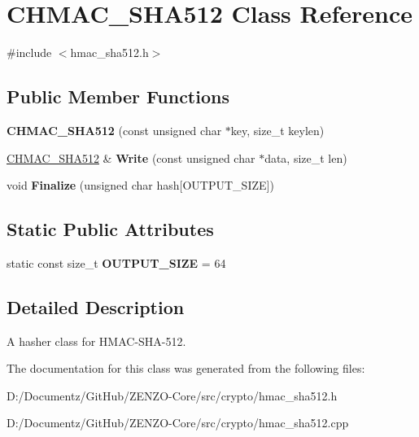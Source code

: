 \hypertarget{class_c_h_m_a_c___s_h_a512}{}\section{C\+H\+M\+A\+C\+\_\+\+S\+H\+A512 Class Reference}
\label{class_c_h_m_a_c___s_h_a512}


{\ttfamily \#include $<$hmac\+\_\+sha512.\+h$>$}

\subsection*{Public Member Functions}
\begin{DoxyCompactItemize}
\item 
\mbox{\label{class_c_h_m_a_c___s_h_a512_a03e1288c20422f66b7e732aafda804e5}} 
{\bfseries C\+H\+M\+A\+C\+\_\+\+S\+H\+A512} (const unsigned char $\ast$key, size\+\_\+t keylen)
\item 
\mbox{\label{class_c_h_m_a_c___s_h_a512_aefdf2b068b668027b67c8822227a5a18}} 
\mbox{\hyperlink{class_c_h_m_a_c___s_h_a512}{C\+H\+M\+A\+C\+\_\+\+S\+H\+A512}} \& {\bfseries Write} (const unsigned char $\ast$data, size\+\_\+t len)
\item 
\mbox{\label{class_c_h_m_a_c___s_h_a512_a3042ed5129bd381eb18ed2da201d6ed5}} 
void {\bfseries Finalize} (unsigned char hash\mbox{[}O\+U\+T\+P\+U\+T\+\_\+\+S\+I\+ZE\mbox{]})
\end{DoxyCompactItemize}
\subsection*{Static Public Attributes}
\begin{DoxyCompactItemize}
\item 
\mbox{\label{class_c_h_m_a_c___s_h_a512_a3baae67a0cf9702e18fff8f4f7ae05b6}} 
static const size\+\_\+t {\bfseries O\+U\+T\+P\+U\+T\+\_\+\+S\+I\+ZE} = 64
\end{DoxyCompactItemize}


\subsection{Detailed Description}
A hasher class for H\+M\+A\+C-\/\+S\+H\+A-\/512. 

The documentation for this class was generated from the following files\+:\begin{DoxyCompactItemize}
\item 
D\+:/\+Documentz/\+Git\+Hub/\+Z\+E\+N\+Z\+O-\/\+Core/src/crypto/hmac\+\_\+sha512.\+h\item 
D\+:/\+Documentz/\+Git\+Hub/\+Z\+E\+N\+Z\+O-\/\+Core/src/crypto/hmac\+\_\+sha512.\+cpp\end{DoxyCompactItemize}
